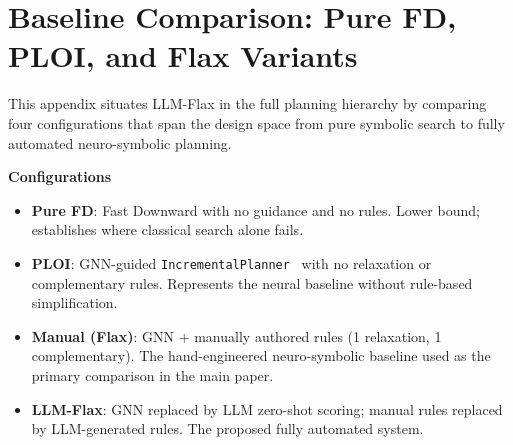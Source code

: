 \documentclass[letterpaper, 10pt, journal, twoside]{IEEEtran}
\newcommand{\myparagraph}[1]{\noindent\textbf{#1}~}
\newcommand{\method}{LLM-Flax\xspace}
\begin{document}
\section{Baseline Comparison: Pure FD, PLOI, and Flax Variants}
\label{app:baselines}

This appendix situates \method in the full planning hierarchy by comparing four configurations that span the design space from pure symbolic search to fully automated neuro-symbolic planning.

\myparagraph{Configurations}
\begin{itemize}[noitemsep,topsep=2pt]
  \item \textbf{Pure FD}: Fast Downward with no guidance and no rules.
    Lower bound; establishes where classical search alone fails.
  \item \textbf{PLOI}: GNN-guided \texttt{IncrementalPlanner}~\cite{silver2021planning} with no relaxation or complementary rules.
    Represents the neural baseline without rule-based simplification.
  \item \textbf{Manual (Flax)}: GNN + manually authored rules (1 relaxation, 1 complementary).
    The hand-engineered neuro-symbolic baseline used as the primary comparison in the main paper.
  \item \textbf{\method}: GNN replaced by LLM zero-shot scoring; manual rules replaced by LLM-generated rules.
    The proposed fully automated system.
\end{itemize}
\end{document}

